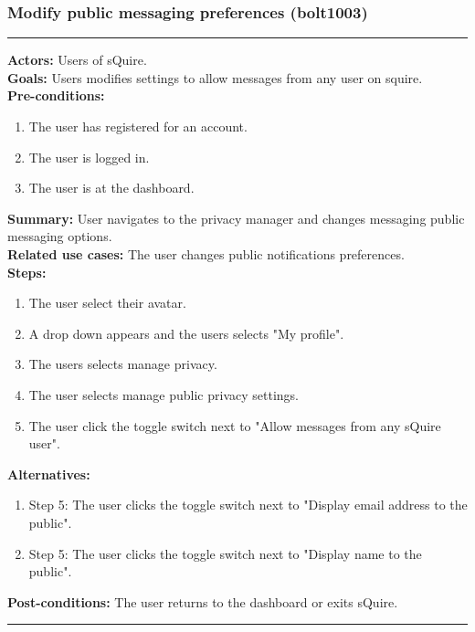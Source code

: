\documentclass[11pt]{report}
\begin{document}
\subsubsection{Modify public messaging preferences (bolt1003)}
\vspace{2pt}
\hrule
\vspace{8pt}
 \textbf{Actors:} Users of sQuire. \\ 
 \textbf{Goals:} Users modifies settings to allow messages from any user on squire. \\
 \textbf{Pre-conditions:} \begin{enumerate}
  \item The user has registered for an account.
  \item The user is logged in.
  \item The user is at the dashboard.
 \end{enumerate}
 \textbf{Summary:} User navigates to the privacy manager and changes messaging public messaging options.\\ 
 \textbf{Related use cases:} The user changes public notifications preferences. \\ 
 \textbf{Steps:} \begin{enumerate}
  \item The user select their avatar.
  \item A drop down appears and the users selects "My profile".
  \item The users selects manage privacy.
  \item The user selects manage public privacy settings.
  \item The user click the toggle switch next to "Allow messages from any sQuire user".
 \end{enumerate}
 \textbf{Alternatives:} \begin{enumerate} 
  \item Step 5: The user clicks the toggle switch next to "Display email address to the public".
  \item Step 5: The user clicks the toggle switch next to "Display name to the public".
 \end{enumerate}
 \textbf{Post-conditions:} The user returns to the dashboard or exits sQuire. \\
 \vspace{8pt}
\hrule
\newpage
\end{document}
